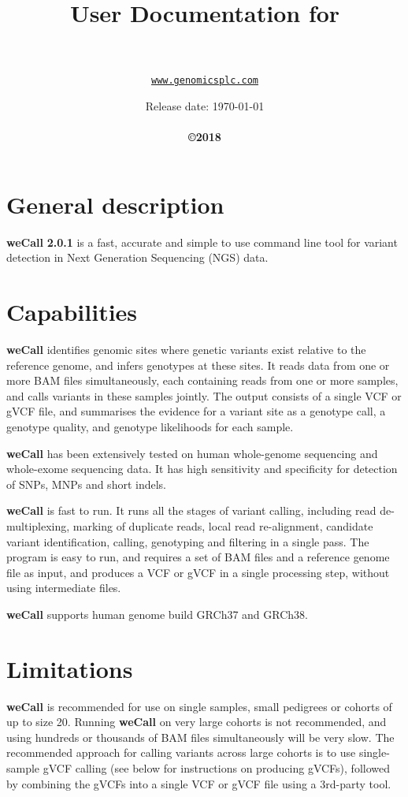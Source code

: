 \documentclass{article}
\title{User Documentation for {\wecallbranding}}
\author{
    {\companyname}\\\\
    \texttt{\url{www.genomicsplc.com}}
}
\date{Release date: \today\\\vspace{5mm}\textit\\\vspace{5mm}
  \small{\textbf{
      \vspace{5mm}\copyright 2018 {\companyname}}}}
\newcommand{\wecallproduct}{\textbf{weCall}}
\newcommand{\wecallversion}{\textbf{2.0.1}}
\newcommand{\wecallbranding}{{\wecallproduct} {\wecallversion}}
\begin{document}
\maketitle
\hypersetup{linkcolor=black}
\tableofcontents
\newpage


\section{General description}
{\wecallbranding} is a fast, accurate and simple to use command line tool for variant detection in Next Generation Sequencing (NGS) data.
        
\section{Capabilities}
\textbf{{\wecallproduct}} identifies genomic sites where genetic variants exist relative to the reference genome,
and infers genotypes at these sites.  It reads data from one or more BAM files simultaneously, each containing reads from one or more samples,
and calls variants in these samples jointly.  The output consists of a single VCF or gVCF file, and summarises the evidence for a variant site
as a genotype call, a genotype quality, and genotype likelihoods for each sample.

\textbf{{\wecallproduct}} has been extensively tested on human whole-genome sequencing and whole-exome sequencing data. It has high sensitivity and specificity
for detection of SNPs, MNPs and short indels.

{\wecallproduct} is fast to run.  It runs all the stages of variant calling, including read de-multiplexing,
marking of duplicate reads, local read re-alignment, candidate variant identification, calling, genotyping and filtering in a single pass.  The program is easy to run,
and requires a set of BAM files and a reference genome file as input, and produces a VCF or gVCF in a single processing step, without using intermediate files.

 \textbf{{\wecallproduct}} supports human genome build GRCh37 and GRCh38.

 \section{Limitations}
 
\textbf{{\wecallproduct}} is recommended for use on single samples, small pedigrees or cohorts of up to size 20.  Running {\wecallproduct}
on very large cohorts is not recommended, and using hundreds or thousands of BAM files simultaneously will be very slow.
The recommended approach for calling variants across large cohorts is to use single-sample gVCF calling (see below for instructions on producing gVCFs),
followed by combining the gVCFs into a single VCF or gVCF file using a 3rd-party tool.
\end{document}
